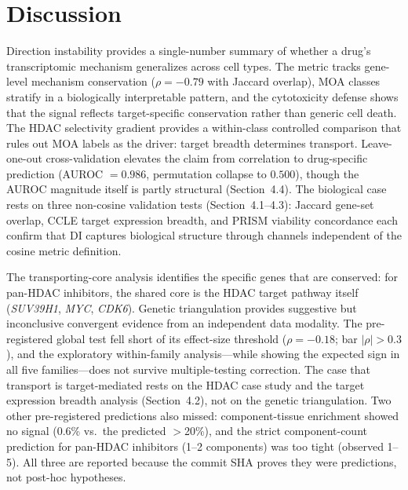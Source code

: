 \documentclass[11pt]{article}
\begin{document}
\section{Discussion}

Direction instability provides a single-number summary of whether a
drug's transcriptomic mechanism generalizes across cell types.  The
metric tracks gene-level mechanism conservation ($\rho = -0.79$ with
Jaccard overlap), MOA classes stratify in a biologically interpretable
pattern, and the cytotoxicity defense shows that the signal reflects
target-specific conservation rather than generic cell death.  The HDAC
selectivity gradient provides a within-class controlled comparison
that rules out MOA labels as the driver: target breadth determines
transport.  Leave-one-out cross-validation elevates the claim from
correlation to drug-specific prediction (AUROC $= 0.986$, permutation
collapse to $0.500$), though the AUROC magnitude itself is partly
structural (Section~4.4).  The biological case rests on three
non-cosine validation tests (Section~4.1--4.3): Jaccard gene-set
overlap, CCLE target expression breadth, and PRISM viability
concordance each confirm that DI captures biological structure through
channels independent of the cosine metric definition.

The transporting-core analysis identifies the specific genes that are
conserved: for pan-HDAC inhibitors, the shared core is the HDAC target
pathway itself (\emph{SUV39H1}, \emph{MYC}, \emph{CDK6}).  Genetic
triangulation provides suggestive but inconclusive convergent evidence
from an independent data modality.  The pre-registered global test fell
short of its effect-size threshold ($\rho = -0.18$; bar $|\rho| > 0.3$),
and the exploratory within-family analysis---while showing the expected
sign in all five families---does not survive multiple-testing correction.
The case that transport is target-mediated rests on the HDAC case study
and the target expression breadth analysis (Section~4.2), not on the
genetic triangulation.  Two other pre-registered predictions also
missed: component-tissue enrichment showed no signal
(0.6\% vs.\ the predicted $>$20\%), and the strict component-count
prediction for pan-HDAC inhibitors (1--2 components) was too tight
(observed 1--5).  All three are reported because the commit SHA proves
they were predictions, not post-hoc hypotheses.
\end{document}
